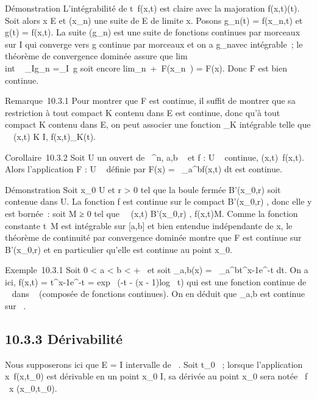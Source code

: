 \documentclass[]{article}
\begin{document}
Démonstration L'intégrabilité de t\mapsto~f(x,t) est
claire avec la majoration f(x,t)\leq \phi(t). Soit alors x
\in E et (x_n) une suite de E de limite x. Posons g_n(t)
= f(x_n,t) et g(t) = f(x,t). La suite (g_n) est une
suite de fonctions continues par morceaux sur I qui converge vers g
continue par morceaux et on a g_n\leq \phi avec \phi
intégrable~; le théorème de convergence dominée assure que
lim\\int ~
_Ig_n =\int  _I~g soit
encore lim_n\rightarrow~+\infty~F(x_n~) =
F(x). Donc F est bien continue.

Remarque~10.3.1 Pour montrer que F est continue, il suffit de montrer
que sa restriction à tout compact K contenu dans E est continue, donc
qu'à tout compact K contenu dans E, on peut associer une fonction
\phi_K intégrable telle que \forall~~(x,t) \in K \times
I, f(x,t)\leq \phi_K(t).

Corollaire~10.3.2 Soit U un ouvert de ~^n, a,b \in {}~ et f : U \times
[a,b] \rightarrow~  continue, (x,t)\mapsto~f(x,t). Alors
l'application F : U \rightarrow~  définie par F(x) =\int ~
_a^bf(x,t) dt est continue.

Démonstration Soit x_0 \in U et r > 0 tel que la
boule fermée B'(x_0,r) soit contenue dans U. La fonction f est
continue sur le compact B'(x_0,r) \times [a,b], donc elle y est
bornée~: soit M ≥ 0 tel que \forall~~(x,t) \in
B'(x_0,r) \times [a,b], f(x,t)\leq M. Comme la
fonction constante t\mapsto~M est intégrable sur
[a,b] et bien entendue indépendante de x, le théorème de continuité
par convergence dominée montre que F est continue sur B'(x_0,r)
et en particulier qu'elle est continue au point x_0.

Exemple~10.3.1 Soit 0 < a < b < +\infty~ et soit
\Gamma_a,b(x) =\int ~
_a^bt^x-1e^-t dt. On a ici, f(x,t) =
t^x-1e^-t = exp~ (-t - (x
- 1)log~ t) qui est une fonction continue de ~
\times [a,b] dans ~ (composée de fonctions continues). On en déduit que
\Gamma_a,b est continue sur ~.

\subsection{10.3.3 Dérivabilité}

Nous supposerons ici que E = I intervalle de ~. Soit t_0 \in
[a,b]~; lorsque l'application
x\mapsto~f(x,t_0) est dérivable en un point
x_0 \in I, sa dérivée au point x_0 sera notée  \partial~f
\over \partial~x (x_0,t_0).
\end{document}
